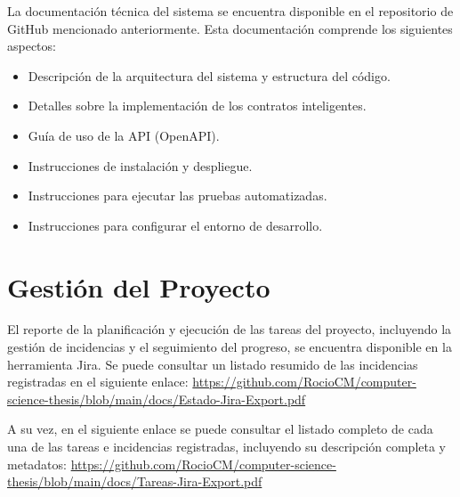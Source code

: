 La documentación técnica del sistema se encuentra disponible en el repositorio de GitHub mencionado anteriormente. Esta documentación comprende los siguientes aspectos:

\begin{itemize}
	\item Descripción de la arquitectura del sistema y estructura del código.
	\item Detalles sobre la implementación de los contratos inteligentes.
	\item Guía de uso de la API (OpenAPI).
	\item Instrucciones de instalación y despliegue.
	\item Instrucciones para ejecutar las pruebas automatizadas.
	\item Instrucciones para configurar el entorno de desarrollo.
\end{itemize}

\section{Gestión del Proyecto}

El reporte de la planificación y ejecución de las tareas del proyecto, incluyendo la gestión de incidencias y el seguimiento del progreso, se encuentra disponible en la herramienta Jira. Se puede consultar un listado resumido de las incidencias registradas en el siguiente enlace: \url{https://github.com/RocioCM/computer-science-thesis/blob/main/docs/Estado-Jira-Export.pdf}

A su vez, en el siguiente enlace se puede consultar el listado completo de cada una de las tareas e incidencias registradas, incluyendo su descripción completa y metadatos: \url{https://github.com/RocioCM/computer-science-thesis/blob/main/docs/Tareas-Jira-Export.pdf}
